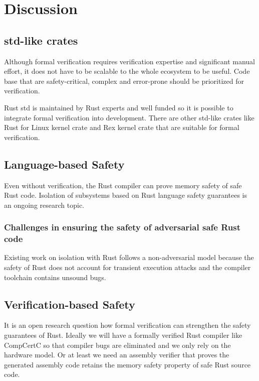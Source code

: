 \documentclass[conference]{IEEEtran}
\begin{document}



\section{Discussion}
\subsection{std-like crates}
Although formal verification requires verification expertise and significant manual effort, it does not have to be scalable to the whole ecosystem to be useful. Code base that are safety-critical, complex and error-prone should be prioritized for verification. 

Rust std is maintained by Rust experts and well funded so it is possible to integrate formal verification into development.
There are other std-like crates like Rust for Linux\cite{Rust_for_Linux} kernel crate and Rex\cite{rax} kernel crate that are suitable for formal verification.  
\subsection{Language-based Safety}
Even without verification, the Rust compiler can prove memory safety of safe Rust code. Isolation of subsystems based on Rust language safety guarantees\cite{Theusus,Redleaf,TockOS,rax} is an ongoing research topic. 

\subsubsection{Challenges in ensuring the safety of adversarial safe Rust code}
Existing work on isolation with Rust follows a non-adversarial model because the safety of Rust does not account for transient execution attacks and the compiler toolchain contains unsound bugs.   

\subsection{Verification-based Safety}
It is an open research question how formal verification can strengthen the safety guarantees of Rust. 
Ideally we will have a formally verified Rust compiler like CompCertC so that compiler bugs are eliminated and we only rely on the hardware model. Or at least we need an assembly verifier that proves the generated assembly code retains the memory safety property of safe Rust source code.   
\end{document}
